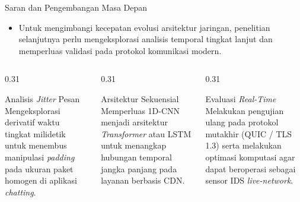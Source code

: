 \documentclass[
  aspectratio=169,
]{beamer}
\begin{document}
\begin{frame}{Saran dan Pengembangan Masa Depan}{}

    \begin{itemize}
        \item Untuk mengimbangi kecepatan evolusi arsitektur jaringan, penelitian selanjutnya perlu mengeksplorasi analisis temporal tingkat lanjut dan memperluas validasi pada protokol komunikasi modern.
    \end{itemize}
    
    \vspace{0.4cm}
    
    \begin{columns}[T,onlytextwidth]
        \begin{column}{0.31\textwidth}
            \begin{exampleblock}{Analisis \textit{Jitter} Pesan}
            Mengeksplorasi derivatif waktu tingkat milidetik untuk menembus manipulasi \textit{padding} pada ukuran paket homogen di aplikasi \textit{chatting}.
            \end{exampleblock}
        \end{column}
        \hfill
        \begin{column}{0.31\textwidth}
            \begin{exampleblock}{Arsitektur Sekuensial}
            Memperluas 1D-CNN menjadi arsitektur \textit{Transformer} atau LSTM untuk menangkap hubungan temporal jangka panjang pada layanan berbasis CDN.
            \end{exampleblock}
        \end{column}
        \hfill
        \begin{column}{0.31\textwidth}
            \begin{exampleblock}{Evaluasi \textit{Real-Time}}
            Melakukan pengujian ulang pada protokol mutakhir (QUIC / TLS 1.3) serta melakukan optimasi komputasi agar dapat beroperasi sebagai sensor IDS \textit{live-network}.
            \end{exampleblock}
        \end{column}
    \end{columns}

\end{frame}

\begin{frame}[plain]
    \vfill
    \begin{center}
        {\Huge {}}
    \end{center}
    \vfill
\end{frame}
\end{document}
